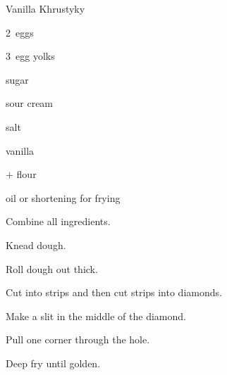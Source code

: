 \begin{recipe}{Vanilla Khrustyky}{}{}

\begin{ingredients}
\item 2~eggs
\item 3~egg yolks
\item {} sugar
\item {} sour cream
\item \tp{\half} salt
\item {} vanilla
\item {}$+$ flour
\item oil or shortening for frying
\end{ingredients}

\begin{directions}
\item Combine all ingredients.
\item Knead dough.
\item Roll dough out \inch{\eighth} thick.
\item Cut into strips and then cut strips into diamonds.
\item Make a slit in the middle of the diamond.
\item Pull one corner through the hole.
\item Deep fry until golden.
\end{directions}

\end{recipe}
